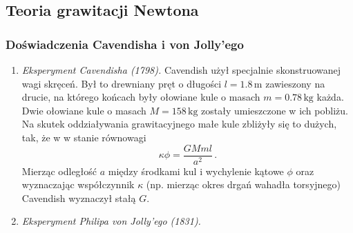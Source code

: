 \documentclass[../main.tex]{subfiles}
\begin{document}
\subsection{Teoria grawitacji Newtona}

\noindent{}
\subsubsection{Doświadczenia Cavendisha i von Jolly'ego}
\begin{enumerate}
    \item \textit{Eksperyment Cavendisha (1798).} Cavendish użył specjalnie skonstruowanej wagi
    skręceń. Był to drewniany pręt o długości \(l=1.8\,\text{m}\) zawieszony na drucie, na którego
    końcach były ołowiane kule o masach \(m=0.78\,\text{kg}\) każda. Dwie ołowiane kule o masach
    \(M=158\,\text{kg}\) zostały umieszczone w ich pobliżu. Na skutek oddziaływania grawitacyjnego
    małe kule zbliżyły się to dużych, tak, że w w stanie równowagi
    \begin{equation*}
        \kappa \phi=\frac{GMml}{a^2}\,.
    \end{equation*}
    Mierząc odległość \(a\) między środkami kul i wychylenie kątowe \(\phi\) oraz wyznaczając
    współczynnik \(\kappa\) (np. mierząc okres drgań wahadła torsyjnego) Cavendish wyznaczył stałą
    \(G\).
    
    \item \textit{Eksperyment Philipa von Jolly'ego (1831). }
\end{enumerate}
\end{document}
